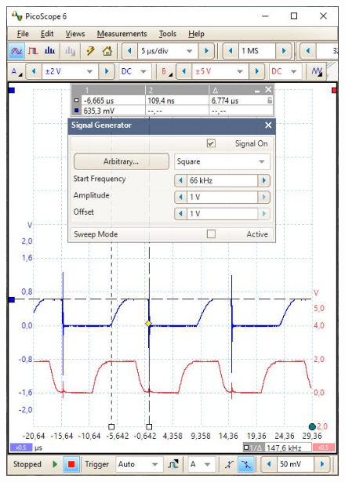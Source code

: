 \begin{figure}[H]
	\centering
	\begin{minipage}{.4\linewidth}
		\centering
		\includegraphics[width=\textwidth]{figures/results/power_led_driver/66khz.JPG}
		\label{fig:pwr_led_66k}
	\end{minipage}
	\hspace{.1\linewidth}
	\begin{minipage}{.4\linewidth}
		\centering

\end{minipage}
\end{figure}
